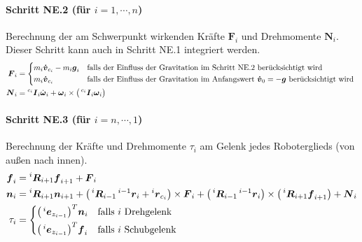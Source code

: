 \documentclass[a4paper, 11pt, accentcolor = tud3b]{tudreport}
\newcommand{\inreferenceto}[2]{\prescript{#1}{}{#2}}
\newcommand{\mat}[1]{\boldsymbol{#1}}
\renewcommand{\vec}[1]{\boldsymbol{#1}}
\begin{document}
				\paragraph{Schritt NE.2 (für \( i = 1, \cdots, n \))}
					Berechnung der am Schwerpunkt wirkenden Kräfte \( \vec{F}_i \) und Drehmomente \( \vec{N}_i \). Dieser Schritt kann auch in Schritt NE.1 integriert werden.
					\begin{align*}
						\vec{F}_i &=
							\begin{cases*}
								m_i \vec{\dot{v}}_{c_i} - m_i \vec{g}_i & falls der Einfluss der Gravitation im Schritt NE.2 berücksichtigt wird \\
								m_i \vec{\dot{v}}_{c_i}                 & falls der Einfluss der Gravitation im Anfangswert \( \vec{\dot{v}}_0 = -\vec{g} \) berücksichtigt wird
							\end{cases*} \\
						\vec{N}_i &= \inreferenceto{c_i}{\mat{I}}_i \dot{\vec{\omega}}_i + \vec{\omega}_i \times \big( \inreferenceto{c_i}{\mat{I}}_i \vec{\omega}_i \big)
					\end{align*}
				
				\paragraph{Schritt NE.3 (für \( i = n, \cdots, 1 \))}
					Berechnung der Kräfte und Drehmomente \( \tau_i \) am Gelenk jedes Roboterglieds (von außen nach innen).
					\begin{align*}
						\vec{f}_i &= \inreferenceto{i}{\mat{R}}_{i + 1} \vec{f}_{i + 1} + \vec{F}_i \\
						\vec{n}_i &= \inreferenceto{i}{\mat{R}}_{i + 1} \vec{n}_{i + 1} + \big( \inreferenceto{i}{\mat{R}}_{i - 1} \inreferenceto{i - 1}{\vec{r}}_i + \inreferenceto{i}{\vec{r}}_{c_i} \big) \times \vec{F}_i + \big( \inreferenceto{i}{\mat{R}}_{i - 1} \inreferenceto{i - 1}{\vec{r}}_i \big) \times \big( \inreferenceto{i}{\mat{R}}_{i + 1} \vec{f}_{i + 1} \big) + \vec{N}_i \\
						\tau_i &=
							\begin{cases*}
								\big( \inreferenceto{i}{\vec{e}}_{z_{i - 1}} \big)^T \vec{n}_i & falls \(i\) Drehgelenk \\
								\big( \inreferenceto{i}{\vec{e}}_{z_{i - 1}} \big)^T \vec{f}_i & falls \(i\) Schubgelenk
							\end{cases*}
					\end{align*}
			
\end{document}

